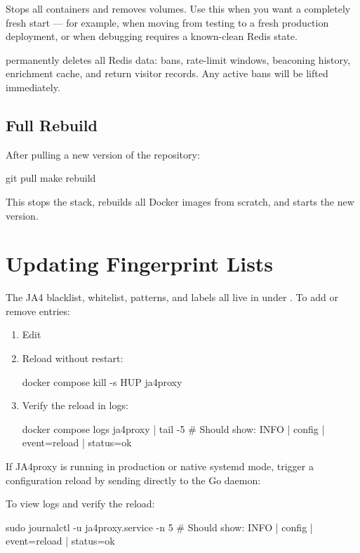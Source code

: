 Stops all containers and removes volumes. Use this when you want a completely
fresh start — for example, when moving from testing to a fresh production deployment,
or when debugging requires a known-clean Redis state.

\begin{dangerbox}
 permanently deletes all Redis data: bans, rate-limit windows,
beaconing history, enrichment cache, and return visitor records. Any active bans
will be lifted immediately.
\end{dangerbox}

\subsection{Full Rebuild}

After pulling a new version of the repository:

\begin{bashcode}
git pull
make rebuild
\end{bashcode}

This stops the stack, rebuilds all Docker images from scratch, and starts the
new version.

\section{Updating Fingerprint Lists}

The JA4 blacklist, whitelist, patterns, and labels all live in
 under . To add or remove entries:

\begin{enumerate}
  \item Edit 
  \item Reload without restart:
\begin{bashcode}
docker compose kill -s HUP ja4proxy
\end{bashcode}
  \item Verify the reload in logs:
\begin{bashcode}
docker compose logs ja4proxy | tail -5
# Should show: INFO | config | event=reload | status=ok
\end{bashcode}
\end{enumerate}

\begin{notebox}
If JA4proxy is running in production or native systemd mode, trigger a configuration reload by sending  directly to the Go daemon:
To view logs and verify the reload:
\begin{bashcode}
sudo journalctl -u ja4proxy.service -n 5
# Should show: INFO | config | event=reload | status=ok
\end{bashcode}
\end{notebox}

